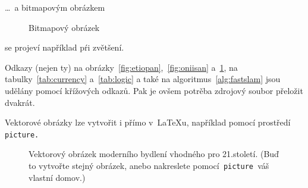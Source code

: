\documentclass[a4paper, 11pt]{article}
\begin{document}
\bigskip
\noindent\dots~a bitmapovým obrázkem

\begin{figure}[ht]
    \centering
    \caption{Bitmapový obrázek}
    \label{fig:oniisan2}
\end{figure}

\bigskip
\noindent se projeví například pŕi zvětšení.

Odkazy (nejen ty) na obrázky~\ref{fig:etiopan},~\ref{fig:oniisan} a~\ref{fig:oniisan2}, na tabulky~\ref{tab:currency} a~\ref{tab:logic} a také na algoritmus~\ref{alg:fastslam} jsou udělány pomocí křížových odkazů. Pak je ovšem potrěba zdrojový soubor přeložit dvakrát.

Vektorové obrázky lze vytvořit i přímo v~\LaTeX u, například pomocí prostředí\verb| picture.|
\pagebreak

\setlength{\unitlength}{1cm}
\setlength{\fboxsep}{0pt}

\begin{landscape}
    \vspace*{0.0cm}
    \begin{figure}[ht]
        \centering
        \caption{Vektorový obrázek moderního bydlení vhodného pro 21.století. (Buď to vytvořte stejný obrázek, anebo nakreslete pomocí\texttt{ picture }váš vlastní domov.)}
        \label{fig:home}
    \end{figure}
\end{landscape}
\end{document}
